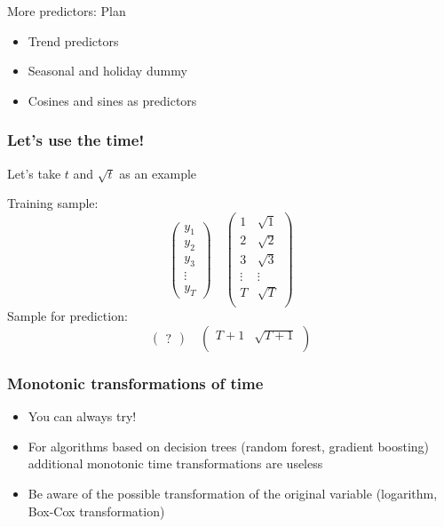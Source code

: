
\begin{frame} %
	
	
	
\end{frame}



\begin{frame}{More predictors: Plan}
	\begin{itemize}[<+->]
		\item \alert{Trend} predictors
		\item \alert{Seasonal} and \alert{holiday} dummy
		\item \alert{Cosines} and \alert{sines} as predictors
	\end{itemize}
	
\end{frame}

\begin{frame}
	\frametitle{Let's use the time!}
	
	Let's take $t$ and $\sqrt{t}$ as an example
	\pause
	
	\alert{Training} sample:
	\[
	\begin{pmatrix}
		y_1 \\
		y_2 \\
		y_3 \\
		\vdots \\
		y_T
	\end{pmatrix} \quad
	\begin{pmatrix}
		1 & \sqrt{1} \\
		2 & \sqrt{2} \\
		3 & \sqrt{3} \\
		\vdots & \vdots \\
		T & \sqrt{T} \\
	\end{pmatrix}
	\]
	\pause
	Sample for \alert{prediction}:
	\[
	\begin{pmatrix}
		?
	\end{pmatrix} \quad
	\begin{pmatrix}
		T+1 & \sqrt{T+1} \\
	\end{pmatrix}
	\]
	
\end{frame}


\begin{frame}
	\frametitle{Monotonic transformations of time}
	
	\begin{itemize}[<+->]
		\item You can always \alert{try}!
		\item For algorithms based on  \alert{decision trees} (random forest, gradient boosting)
		additional monotonic time transformations are \alert{useless}
		\item Be aware of the possible transformation \alert{of the original variable} (logarithm, Box-Cox transformation)
	\end{itemize}
\end{frame}

